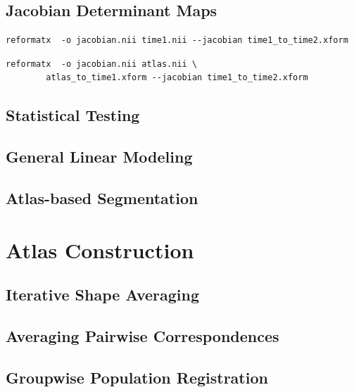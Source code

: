 \documentclass{InsightArticle}
\begin{document}
\subsection{Jacobian Determinant Maps}

\begin{verbatim}
reformatx  -o jacobian.nii time1.nii --jacobian time1_to_time2.xform
\end{verbatim}

\begin{verbatim}
reformatx  -o jacobian.nii atlas.nii \
        atlas_to_time1.xform --jacobian time1_to_time2.xform
\end{verbatim}

\subsection{Statistical Testing}

\subsection{General Linear Modeling}

\subsection{Atlas-based Segmentation}

\section{Atlas Construction}

\subsection{Iterative Shape Averaging}

\cite{RohlBranMaur:2001}
\cite{KuryRohlKrof:2008,BranRohlRyba:2005}

\subsection{Averaging Pairwise Correspondences}

\cite{GuimMeunThir:2000}

\subsection{Groupwise Population Registration}

\cite{Learned-Miller:2006}
\cite{BalcGollShen:2007}
\cite{RohlZahrSull:2008,RohlZahrSull:2010}
\end{document}
